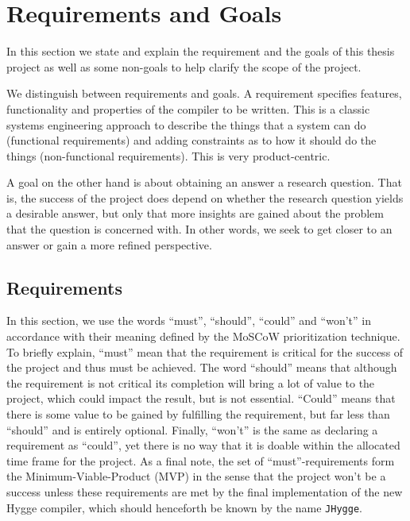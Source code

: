 \chapter{Requirements and Goals} \label{sec:requirements}

In this section we state and explain the requirement and the goals of this thesis project as well as some non-goals to help clarify the scope
of the project.

We distinguish between requirements and goals. A requirement specifies features, functionality and properties of the compiler to be written.
This is a classic systems engineering approach to describe the things that a system can do (functional requirements) and adding constraints as
to how it should do the things (non-functional requirements). This is very product-centric.

A goal on the other hand is about obtaining an answer a research question. That is, the success of the project does depend on whether the research
question yields a desirable answer, but only that more insights are gained about the problem that the question is concerned with. In other words,
we seek to get closer to an answer or gain a more refined perspective.

\section{Requirements}

In this section, we use the words ``must'', ``should'', ``could'' and ``won't'' in accordance with their meaning defined by the MoSCoW prioritization
technique\cite{moscow}. To briefly explain, ``must'' mean that the requirement is critical for the success of the project and thus must be achieved. The
word ``should'' means that although the requirement is not critical its completion will bring a lot of value to the project, which could impact
the result, but is not essential. ``Could'' means that there is some value to be gained by fulfilling the requirement, but far less than ``should''
and is entirely optional.
Finally, ``won't'' is the same as declaring a requirement as ``could'', yet there is no way that it is doable within the allocated time frame for the project.
As a final note, the set of ``must''-requirements form the Minimum-Viable-Product (MVP) in the sense that the project won't be a success unless these
requirements are met by the final implementation of the new Hygge compiler, which should henceforth be known by the name \texttt{JHygge}.

